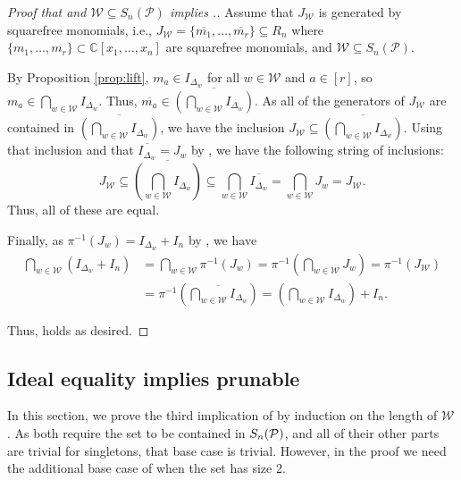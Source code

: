 \begin{proof}[Proof that  and $\mathcal{W}\subseteq S_n(\mathcal{P})$ implies .]
Assume that $J_{\mathcal{W}}$ is generated by squarefree monomials, i.e., \(J_\mathcal{W} = \{\overline{m_1},\dots,\overline{m_r}\}\subseteq R_n\) where \(\{m_1,\dots,m_r\}\subset \mathbb{C}[x_1,\dots,x_n]\) are squarefree monomials, and $\mathcal{W}\subseteq S_n(\mathcal{P})$.


By Proposition \ref{prop:lift}, \(m_a\in I_{\Delta_w}\) for all \(w\in\mathcal{W}\) and \(a\in[r]\), so \(m_a \in  \bigcap_{w\in \mathcal{W}} I_{\Delta_w}\).
Thus, \(\overline{m_a}\in \overline{\left(\bigcap_{w\in \mathcal{W}}  I_{\Delta_w}\right)}\).
As all of the generators of $J_{\mathcal{W}}$ are contained in $\overline{\left(\bigcap_{w\in \mathcal{W}}  I_{\Delta_w}\right)}$, we have the inclusion $J_{\mathcal{W}}\subseteq \overline{\left(\bigcap_{w\in \mathcal{W}}  I_{\Delta_w}\right)}$.
Using that inclusion and that \(\overline{I_{\Delta_w}}=J_w\) by , we have the following string of inclusions:
\[ J_{\mathcal W} \subseteq \overline{\left(\bigcap_{w\in\mathcal W}I_{\Delta_w}\right)} \subseteq \bigcap_{w\in\mathcal W}\overline{I_{\Delta_w} }=\bigcap_{w\in\mathcal W}J_{w} = J_{\mathcal{W}}.\]
Thus, all of these are equal.

Finally, as $\pi^{-1}(J_w) = I_{\Delta_w}+I_n$ by , we have
\[
\begin{aligned}
\bigcap_{w\in\mathcal W}(I_{\Delta_w}+I_n)
&=\bigcap_{w\in\mathcal W}\pi^{-1}(J_w) =\pi^{-1}\!\left(\bigcap_{w\in\mathcal W}J_w\right)
=\pi^{-1}(J_{\mathcal W})\\
&=\pi^{-1}\left(\overline{\bigcap_{w\in\mathcal W}I_{\Delta_w}}\right)
=\left(\bigcap_{w\in\mathcal W}I_{\Delta_w}\right)+I_n.
\end{aligned}
\] 

Thus,  holds as desired.
\end{proof}







\subsection{Ideal equality implies prunable}
In this section, we prove the third implication of  by induction on the length of $\mathcal{W}$.
As both  require the set to be contained in $S_n(\mathcal{P})$, and all of their other parts are trivial for singletons, that base case is trivial.
However, in the proof we need the additional base case of when the set has size 2.

